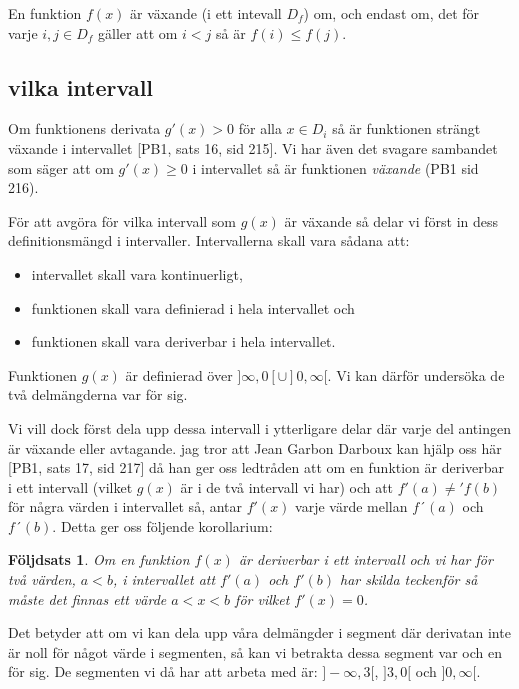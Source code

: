 \documentclass[a4paper, 11pt]{article}
\newtheorem{corollary}{Följdsats}
\begin{document}
En funktion $f(x)$ är växande (i ett intevall $D_f$) om, och endast
om, det för varje $i, j \in D_f$ gäller att om $i < j$ så är $f(i)
\leq f(j)$.


\subsection*{vilka intervall}

Om funktionens derivata $g'(x) > 0$ för alla $ x \in D_i$ så är
funktionen strängt växande i intervallet [PB1, sats 16, sid 215]. Vi har
även det svagare sambandet som säger att om $g'(x) \geq 0$ i
intervallet så är funktionen {\em växande} (PB1 sid 216).

För att avgöra för vilka intervall som $g(x)$ är växande så delar vi
först in dess definitionsmängd i intervaller. Intervallerna
skall vara sådana att:

\begin{itemize}
\item intervallet skall vara kontinuerligt, 
\item funktionen skall vara definierad i hela intervallet och
\item funktionen skall vara deriverbar i hela intervallet.
\end{itemize}
 
Funktionen $g(x)$ är definierad över $]\infty, 0[ \cup ]0, \infty[$. Vi
kan därför undersöka de två delmängderna var för sig.


Vi vill dock först dela upp dessa intervall i ytterligare delar där
varje del antingen är växande eller avtagande. jag tror att Jean
Garbon Darboux kan hjälp oss här [PB1, sats 17, sid 217] då han ger
oss ledtråden att om en funktion är deriverbar i ett intervall (vilket
$g(x)$ är i de två intervall vi har) och att $f'(a) \neq 'f(b)$ för
några värden i intervallet så, antar $f'(x)$ varje värde mellan
$f´(a)$ och $f´(b)$. Detta ger oss följende korollarium:

\begin{corollary}
  Om en funktion $f(x)$ är deriverbar i ett intervall och vi har för
  två värden, $a < b$, i intervallet att $f'(a)$ och $f'(b)$ har
  skilda teckenför så måste det finnas ett värde $a < x < b$ för
  vilket $f'(x) = 0$.
\end{corollary}

Det betyder att om vi kan dela upp våra delmängder i segment där
derivatan inte är noll för något värde i segmenten, så kan vi betrakta
dessa segment var och en för sig. De segmenten vi då har att arbeta
med är: $]-\infty, 3[$, $]3,0[$ och $]0,\infty[$.
\end{document}
